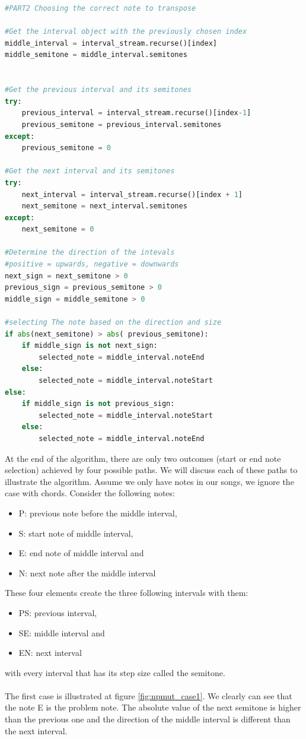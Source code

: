 \documentclass[a4paper]{article}
\begin{document}
\begin{lstlisting}[language=Python,caption={Part 2 of the simplified version of the Neighbour pitch mutation algorithm: choosing the right note.},captionpos=b,label=code:choosing_the_note]
#PART2 Choosing the correct note to transpose

#Get the interval object with the previously chosen index
middle_interval = interval_stream.recurse()[index] 
middle_semitone = middle_interval.semitones


#Get the previous interval and its semitones
try:
	previous_interval = interval_stream.recurse()[index-1]
	previous_semitone = previous_interval.semitones
except:
	previous_semitone = 0
	
#Get the next interval and its semitones
try:
	next_interval = interval_stream.recurse()[index + 1]
	next_semitone = next_interval.semitones
except:
	next_semitone = 0
	
#Determine the direction of the intevals
#positive = upwards, negative = downwards
next_sign = next_semitone > 0
previous_sign = previous_semitone > 0
middle_sign = middle_semitone > 0

#selecting The note based on the direction and size
if abs(next_semitone) > abs( previous_semitone):
	if middle_sign is not next_sign:
		selected_note = middle_interval.noteEnd
	else:
		selected_note = middle_interval.noteStart
else:
	if middle_sign is not previous_sign:
		selected_note = middle_interval.noteStart
	else:
		selected_note = middle_interval.noteEnd

\end{lstlisting}
At the end of the algorithm, there are only two outcomes (start or end note selection) achieved by four possible paths. We will discuss each of these paths to illustrate the algorithm. Assume we only have notes in our songs, we ignore the case with chords.
Consider the following notes:
\begin{itemize}
	\item P: previous note before the middle interval,
	\item S: start note of middle interval,
	\item E: end note of middle interval and
	\item N: next note after the middle interval
\end{itemize}
These four elements create the three following intervals with them:

\begin{itemize}
	\item PS: previous interval,
	\item SE: middle interval and
	\item EN: next interval 
\end{itemize}
with every interval that has its step size called the semitone.
\\\\
The first case is illustrated at figure \ref{fig:npmut_case1}. We clearly can see that the note E is the problem note. The absolute value of the next semitone is higher than the previous one and the direction of the middle interval is different than the next interval.
\end{document}
